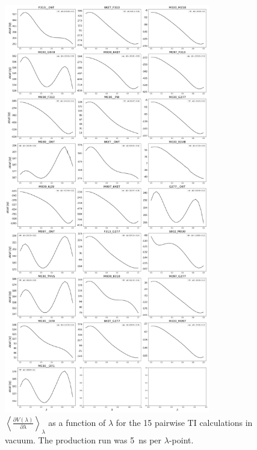 \begin{figure}[H]
    \centering
    \includegraphics[width=0.8\textwidth]{fig/SI/dG_convergence/TI_vacuum_lambda_curves.png}
    \caption{$\left< \frac{\partial V(\lambda)}{\partial \lambda} \right>_{\lambda}$ as a function of $\lambda$ for the 15 pairwise TI calculations in vacuum. The production run was 5~ns per $\lambda$-point.}
    \label{SIfig:TI_vacuum_curve}
    \end{figure}

